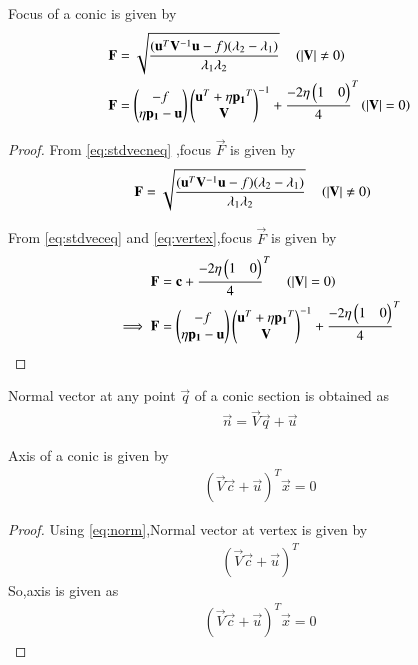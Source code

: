 \documentclass[journal,12pt,twocolumn]{IEEEtran}
\begin{document}
\begin{lemma}
Focus of a conic is given by 
\begin{align}
\mathbf{F} &= \sqrt{\frac{(\mathbf{u}^T\mathbf{V}^{-1}\mathbf{u}-f)(\lambda_2-\lambda_1)}{\lambda_1\lambda_2}} \quad \left(\left\vert\mathbf{V}\right\vert \neq 0\right) \label{eq:focusneq}
\\
\mathbf{F} &= \begin{pmatrix}-f \\ \eta\mathbf{p_1} - \mathbf{u}\end{pmatrix}{\ensuremath{\begin{pmatrix}\mathbf{u}^T + \eta\mathbf{p_1}^T \\ \mathbf{V}\end{pmatrix}}}^{-1}+{\frac{-2\eta\begin{pmatrix}1 & 0\end{pmatrix}}{4}}^{T} \left(\left\vert\mathbf{V}\right\vert = 0\right) \label{eq:focus}
\end{align}
\end{lemma}

\begin{proof}
From \eqref{eq:stdvecneq} ,focus $\vec{F}$ is given by
\begin{align}
\mathbf{F} &= \sqrt{\frac{(\mathbf{u}^T\mathbf{V}^{-1}\mathbf{u}-f)(\lambda_2-\lambda_1)}{\lambda_1\lambda_2}} \quad \left(\left\vert\mathbf{V}\right\vert \neq 0\right)
\end{align}

From \eqref{eq:stdveceq} and \eqref{eq:vertex},focus $\vec{F}$ is given by
\begin{align}
\mathbf{F} &= \mathbf{c} + {\frac{-2\eta\begin{pmatrix}1 & 0\end{pmatrix}}{4}}^{T} \quad \left(\left\vert\mathbf{V}\right\vert = 0\right)\\
\implies \mathbf{F} &= \begin{pmatrix}-f \\ \eta\mathbf{p_1} - \mathbf{u}\end{pmatrix}{\ensuremath{\begin{pmatrix}\mathbf{u}^T + \eta\mathbf{p_1}^T \\ \mathbf{V}\end{pmatrix}}}^{-1} + {\frac{-2\eta\begin{pmatrix}1 & 0\end{pmatrix}}{4}}^{T}
\end{align}
\end{proof}

\begin{lemma}
Normal vector at any point $\vec{q}$ of a conic section is obtained as 
\begin{align}
    \vec{n}=\vec{V}\vec{q} + \vec{u}
\end{align}
\label{eq:norm}
\end{lemma}

\begin{lemma}
Axis of a conic is given by
\begin{align}
(\vec{V}\vec{c}+\vec{u})^{T}\vec{x} = 0 \label{eq:axis}
\end{align}
\end{lemma}

\begin{proof}
Using \eqref{eq:norm},Normal vector at vertex is given by 
\begin{align}
    (\vec{V}\vec{c} + \vec{u})^T
\end{align}
So,axis is given as 
\begin{align}
    (\vec{V}\vec{c}+\vec{u})^{T}\vec{x} = 0
\end{align}
\end{proof}
\end{document}
